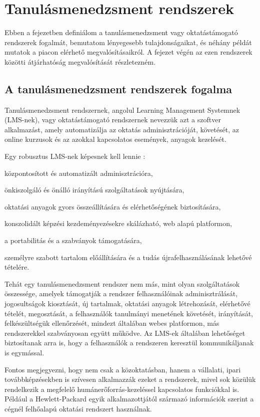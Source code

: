 \chapter{Tanulásmenedzsment rendszerek}

Ebben a fejezetben definiálom a tanulásmenedzsment vagy oktatástámogató rendszerek fogalmát, bemutatom lényegesebb tulajdonságaikat, és néhány példát mutatok a piacon elérhető megvalósításaikról. A fejezet végén az ezen rendszerek közötti átjárhatóság megvalósítását részletezném.

\section{A tanulásmenedzsment rendszerek fogalma}
Tanulásmenedzsment rendszernek, angolul Learning Management Systemnek (LMS-nek), vagy oktatástámogató rendszernek nevezzük azt a szoftver alkalmazást, amely automatizálja az oktatás adminisztrációját, követését, az online kurzusok és az azokkal kapcsolatos események, anyagok kezelését.

Egy robusztus LMS-nek képesnek kell lennie \cite{ellis2009}:
\begin{sajat_itemize}
\item központosított és automatizált adminisztrációra,
\item önkiszolgáló és önálló irányítású szolgáltatások nyújtására,
\item oktatási anyagok gyors összeállítására és elérhetőségének biztosítására,
\item konszolidált képzési kezdeményezésekre skálázható, web alapú platformon,
\item a portabilitás és a szabványok támogatására,
\item személyre szabott tartalom előállítására és a tudás újrafelhasználásának lehetővé tételére.
\end{sajat_itemize}

Tehát egy tanulásmenedzsment rendszer nem más, mint olyan szolgáltatások összessége, amelyek támogatják a rendszer felhasználóinak adminisztrálását, jogosultságok kiosztását, új tartalmak, oktatási anyagok létrehozását, elérhetővé tételét, megosztását, a felhasználók tanulmányi menetének követését, irányítását, felkészültségük ellenőrzését, mindezt általában webes platformon, más rendszerekkel szabványosan együtt működve. Az LMS-ek általában lehetőséget biztosítanak arra is, hogy a felhasználók a rendszeren keresztül kommunikáljanak is egymással.

Fontos megjegyezni, hogy nem csak a közoktatásban, hanem a vállalati, ipari továbbképzésekben is szívesen alkalmazzák ezeket a rendszerek, mivel sok közülük rendelkezik a megfelelő humánerőforrás-kezeléssel kapcsolatos funkciókkal is. Például a Hewlett-Packard egyik alkalmazottjától származó információk szerint a cégnél felhőalapú oktatási rendszert használnak.

